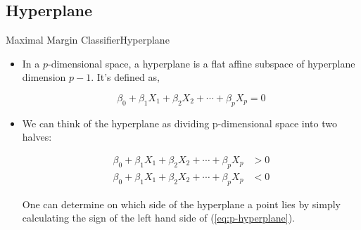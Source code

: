 \subsection{Hyperplane}
\begin{frame}{Maximal Margin Classifier}{Hyperplane}

    \begin{itemize}
        \item In a $p$-dimensional space, a hyperplane is a flat aﬃne subspace of hyperplane dimension $p - 1$. It's defined as, \pause 

        \begin{equation} \label{eq:p-hyperplane}
            \beta_0 + \beta_1 X_1 + \beta_2 X_2 + \cdots + \beta_p X_p= 0
        \end{equation} \pause 

        \item We can think of the hyperplane as dividing p-dimensional space into two halves: \pause 

        \begin{align}
            \beta_0 + \beta_1 X_1 + \beta_2 X_2 + \cdots + \beta_p X_p &> 0 \\ \beta_0 + \beta_1 X_1 + \beta_2 X_2 + \cdots + \beta_p X_p &< 0
        \end{align} \pause 

        One can determine on which side of the hyperplane a point lies by simply calculating the sign of the left hand side of (\ref{eq:p-hyperplane}).
            
    \end{itemize}
\end{frame}

